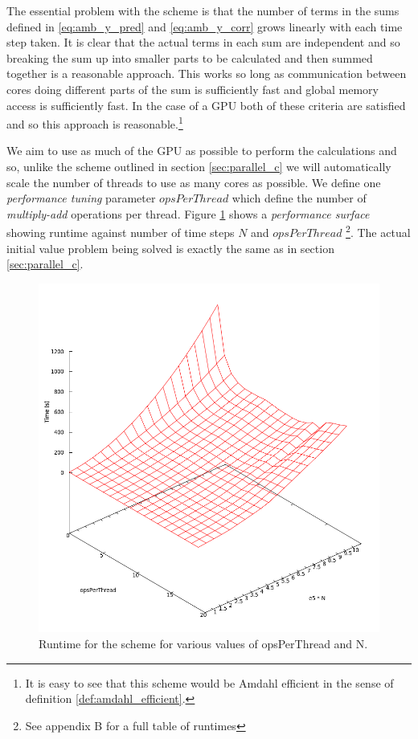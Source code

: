 The essential problem with the scheme is that the number of terms in the sums defined in \eqref{eq:amb_y_pred} and \eqref{eq:amb_y_corr} grows linearly with each time step taken. It is clear that the actual terms in each sum are independent and so breaking the sum up into smaller parts to be calculated and then summed together is a reasonable approach. This works so long as communication between cores doing different parts of the sum is sufficiently fast and global memory access is sufficiently fast. In the case of a GPU both of these criteria are satisfied and so this approach is reasonable.\footnote{It is easy to see that this scheme would be Amdahl efficient in the sense of definition \ref{def:amdahl_efficient}.}

We aim to use as much of the GPU as possible to perform the calculations and so, unlike the scheme outlined in section \ref{sec:parallel_c} we will automatically scale the number of threads to use as many cores as possible. We define one \emph{performance tuning} parameter $ opsPerThread $ which define the number of \emph{multiply-add} operations per thread. 
Figure \ref{fig:cuda_performance_surface} shows a \emph{performance surface} showing runtime against number of time steps $ N $ and $ opsPerThread $ \footnote{See appendix B for a full table of runtimes}. The actual initial value problem being solved is exactly the same as in section \ref{sec:parallel_c}.

\begin{figure}[H]
\includegraphics[scale = 0.4]{images/CUDA_Performance_No_Label}
\caption{Runtime for the scheme for various values of opsPerThread and N.}
\label{fig:cuda_performance_surface}
\end{figure}

